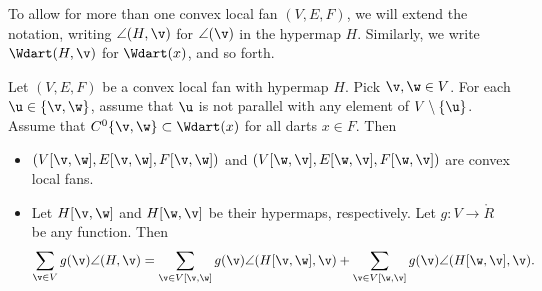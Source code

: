 To allow for more than one convex local fan $(V,E,F)$, we will extend the notation,
writing $\angle(H,\v)$ for $\angle(\v)$ in the hypermap $H$.
Similarly, we write $\Wdart(H,\v)$ for $\Wdart(x)$, and so forth.
%
%


\begin{lemma}[slicing]\label{lemma:slice} Let
$(V,E,F)$ be a convex local fan with hypermap $H$.  Pick $\v,\w\in V$. For
each $\u\in \{\v,\w\}$, assume that $\u$ is not parallel with  any
element of $V\setminus\{\u\}$.  Assume that $C^0\{\v,\w\}\subset
\Wdart(x)$ for all darts $x\in F$.  Then
\begin{itemize}
\item $(V[\v,\w],E[\v,\w],F[\v,\w])$ and
$(V[\w,\v],E[\w,\v],F[\w,\v])$ are convex local fans.
\item Let $H[\v,\w]$ and $H[\w,\v]$ be their hypermaps, respectively.
Let $g:V\to\ring{R}$ be any function.  Then
\begin{displaymath}
  \sum_{\v\in V} g(\v)\angle(H,\v) 
  = \sum_{\v\in V[\v,\w]}g(\v)\angle(H[\v,\w],\v) 
  + \sum_{\v\in V[\w,\v]}g(\v)\angle(H[\w,\v],\v).
\end{displaymath}
\end{itemize}
\end{lemma}
%
%

